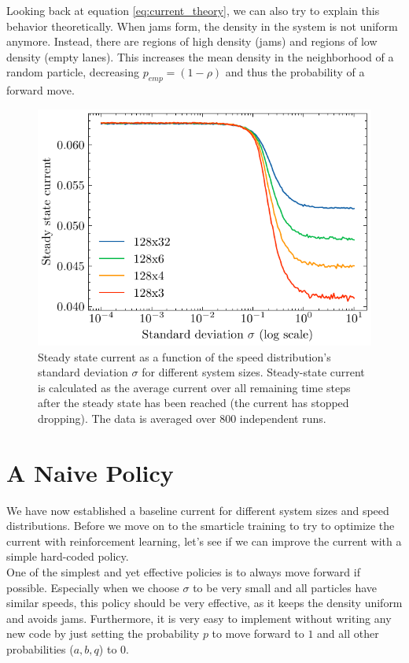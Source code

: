 Looking back at equation \ref{eq:current_theory}, we can also try to explain this behavior theoretically. When jams form, the density in the system is not uniform anymore. Instead, there are regions of high density (jams) and regions of low density (empty lanes). This increases the mean density in the neighborhood of a random particle, decreasing $p_{emp}=(1-\rho)$ and thus the probability of a forward move.  

\begin{figure}[H]
    \centering
    \includegraphics{steady_state_current_sizes_log.pdf}
    \caption{Steady state current as a function of the speed distribution's standard deviation $\sigma$ for different system sizes. Steady-state current is calculated as the average current over all remaining time steps after the steady state has been reached (the current has stopped dropping). The data is averaged over 800 independent runs.}
    \label{fig:steady_state_current_sizes_log}
\end{figure}

\section{A Naive Policy}
We have now established a baseline current for different system sizes and speed distributions. Before we move on to the smarticle training to try to optimize the current with reinforcement learning, let's see if we can improve the current with a simple hard-coded policy. 
\\
One of the simplest and yet effective policies is to always move forward if possible. Especially when we choose $\sigma$ to be very small and all particles have similar speeds, this policy should be very effective, as it keeps the density uniform and avoids jams. Furthermore, it is very easy to implement without writing any new code by just setting the probability $p$ to move forward to $1$ and all other probabilities ($a,b,q$) to $0$.


